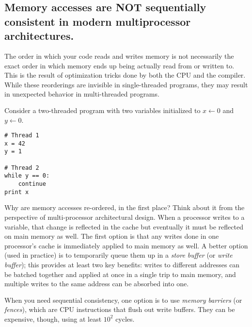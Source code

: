 \subsection{Memory accesses are NOT sequentially consistent in modern multiprocessor architectures.}
The order in which your code reads and writes memory is not necessarily the exact order in which memory ends up being actually read from or written to. This is the result of optimization tricks done by both the CPU and the compiler. While these reorderings are invisible in single-threaded programs, they may result in unexpected behavior in multi-threaded programs.

Consider a two-threaded program with two variables initialized to $x \leftarrow 0$ and $y \leftarrow 0$.

\makebox[\linewidth]{\rule{17cm}{0.4pt}}
{\centering
\begin{verbatim}
# Thread 1
x = 42
y = 1

# Thread 2
while y == 0:
    continue
print x
\end{verbatim}

}
\makebox[\linewidth]{\rule{17cm}{0.4pt}}

Why are memory accesses re-ordered, in the first place? Think about it from the perspective of multi-processor architectural design. When a processor writes to a variable, that change is reflected in the cache but eventually it must be reflected on main memory as well. The first option is that any writes done in one processor's cache is immediately applied to main memory as well. A better option (used in practice) is to temporarily queue them up in a \textit{store buffer} (or \textit{write buffer}); this provides at least two key benefits: writes to different addresses can be batched together and applied at once in a single trip to main memory, and multiple writes to the same address can be absorbed into one.

When you need sequential consistency, one option is to use \textit{memory barriers} (or \textit{fences}), which are CPU instructions that flush out write buffers. They can be expensive, though, using at least $10^2$ cycles.

